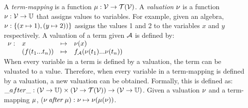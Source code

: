 A \textit{term-mapping} is a function $\mu:\mathcal{V} \rightarrow \mathcal{T}(\mathcal{V})$. A \textit{valuation} $\nu$ is a function $\nu:\mathcal{V} \rightarrow \mathbb{U}$ that assigns values to variables. For example, given an algebra, $\nu:\{(x \mapsto 1), (y \mapsto 2))\}$ assigns the values 1 and 2 to the variables $x$ and $y$ respectively.
A valuation of a term given $\mathcal{A}$ is defined by:
\vspace{8px}\\
$\begin{array}{llcl}
\nu: & x & \mapsto & \nu(x)\\
 & (f(t_1 ... t_n)) & \mapsto & f_{\mathcal{A}}(\nu(t_1) ... \nu(t_n))
 \end{array}$
\vspace{8px}\\
When every variable in a term is defined by a valuation, the term can be valuated to a value. Therefore, when every variable in a term-mapping is defined by a valuation, a new valuation can be obtained. Formally, this is defined as: $\_{after}\_: (\mathcal{V} \rightarrow \mathbb{U}) \times (\mathcal{V} \rightarrow \mathcal{T}(\mathcal{V})) \rightarrow (\mathcal{V} \rightarrow \mathbb{U})$. Given a valuation $\nu$ and a term-mapping $\mu$, ($\nu\:\mathit{after}\:\mu): \nu \mapsto \nu(\mu(\nu))$.
